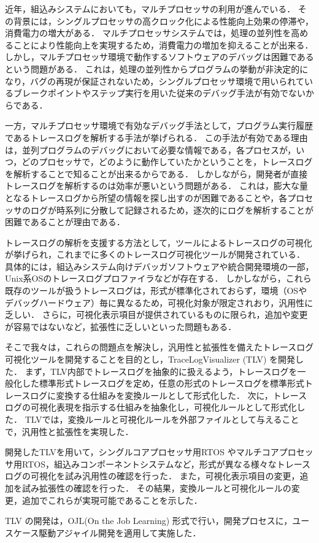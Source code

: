 近年，組込みシステムにおいても，マルチプロセッサの利用が進んでいる．
その背景には，シングルプロセッサの高クロック化による性能向上効果の停滞や，消費電力の増大がある．
マルチプロセッサシステムでは，処理の並列性を高めることにより性能向上を実現するため，消費電力の増加を抑えることが出来る．
しかし，マルチプロセッサ環境で動作するソフトウェアのデバッグは困難であるという問題がある．
これは，処理の並列性からプログラムの挙動が非決定的になり，バグの再現が保証されないため，シングルプロセッサ環境で用いられているブレークポイントやステップ実行を用いた従来のデバッグ手法が有効でないからである．

一方，マルチプロセッサ環境で有効なデバッグ手法として，プログラム実行履歴であるトレースログを解析する手法が挙げられる．
この手法が有効である理由は，並列プログラムのデバッグにおいて必要な情報である，各プロセスが，いつ，どのプロセッサで，どのように動作していたかということを，トレースログを解析することで知ることが出来るからである．
しかしながら，開発者が直接トレースログを解析するのは効率が悪いという問題がある．
これは，膨大な量となるトレースログから所望の情報を探し出すのが困難であることや，各プロセッサのログが時系列に分散して記録されるため，逐次的にログを解析することが困難であることが理由である．

トレースログの解析を支援する方法として，ツールによるトレースログの可視化が挙げられ，これまでに多くのトレースログ可視化ツールが開発されている．
具体的には，組込みシステム向けデバッガソフトウェアや統合開発環境の一部，Unix系OSのトレースログプロファイラなどが存在する．
しかしながら，これら既存のツールが扱うトレースログは，形式が標準化されておらず，環境（OSやデバッグハードウェア）毎に異なるため，可視化対象が限定されおり，汎用性に乏しい．
さらに，可視化表示項目が提供されているものに限られ，追加や変更が容易ではないなど，拡張性に乏しいといった問題もある．

そこで我々は，これらの問題点を解決し，汎用性と拡張性を備えたトレースログ可視化ツールを開発することを目的とし，TraceLogVisualizer (TLV) を開発した．
まず，TLV内部でトレースログを抽象的に扱えるよう，トレースログを一般化した標準形式トレースログを定め，任意の形式のトレースログを標準形式トレースログに変換する仕組みを変換ルールとして形式化した．
次に，トレースログの可視化表現を指示する仕組みを抽象化し，可視化ルールとして形式化した．
TLVでは，変換ルールと可視化ルールを外部ファイルとして与えることで，汎用性と拡張性を実現した．

開発したTLVを用いて，シングルコアプロセッサ用RTOS やマルチコアプロセッサ用RTOS，組込みコンポーネントシステムなど，形式が異なる様々なトレースログの可視化を試み汎用性の確認を行った．
また，可視化表示項目の変更，追加を試み拡張性の確認を行った．
その結果，変換ルールと可視化ルールの変更，追加でこれらが実現可能であることを示した．

TLV の開発は，OJL(On the Job Learning) 形式で行い，開発プロセスに，ユースケース駆動アジャイル開発を適用して実施した．

